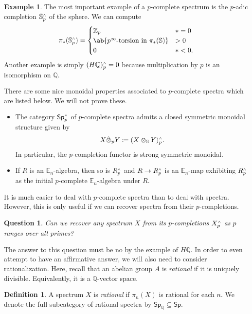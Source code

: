 \documentclass[10pt, oneside]{memoir}
\newtheorem{quest}[thm]{Question}
\theoremstyle{definition}
\newtheorem{defn}[thm]{Definition}
\newtheorem{exm}[thm]{Example}
\theoremstyle{remark}
\theoremstyle{plain}
\theoremstyle{definition}
\theoremstyle{remark}
\newcommand{\Z}{\mathbb{Z}}
\newcommand{\Q}{\mathbb{Q}}
\newcommand{\E}{\mathbb{E}}
\newcommand{\bS}{\mathbb{S}}
\newcommand{\ms}[1]{\mathsf{#1}}
\newcommand{\1}{\mathbf{1}}
\newcommand{\2}{\mathbf{2}}
\newcommand{\3}{\mathbf{3}}
\newcommand{\sw}{\mathsmaller{\wedge}}
\begin{document}
\begin{exm}
    The most important example of a \(p \)-complete spectrum is the \(p \)-adic completion \(\bS_p^{\sw} \) of the sphere. We can compute
    \[ \pi_*(\bS_p^{\sw}) = \begin{cases}
        \Z_p & *=0 \\
        \ab\{\text{\(p^{\infty} \)-torsion in } \pi_*(\bS) \} & > 0 \\
        0 & * < 0.
    \end{cases} \]
    Another example is simply \((H\Q)_p^{\sw} = 0 \) because multiplication by \(p \) is an isomorphism on \(\Q \).
\end{exm}

There are some nice monoidal properties associated to \(p \)-complete spectra which are listed below. We will not prove these.
\begin{itemize}
    \item The category \(\ms{Sp}_p^{\sw} \) of \(p \)-complete spectra admits a closed symmetric monoidal structure given by
    \[ X \hat{\otimes}_p Y \coloneqq (X \otimes_{\bS} Y)_p^{\sw}. \]
    In particular, the \(p \)-completion functor is strong symmetric monoidal.
    \item If \(R \) is an \(\E_n \)-algebra, then so is \(R_p^{\sw} \) and \(R \to R_p^{\sw} \) is an \(\E_n \)-map exhibiting \(R_p^{\sw} \) as the initial \(p \)-complete \(\E_n \)-algebra under \(R \).
\end{itemize}

It is much easier to deal with \(p \)-complete spectra than to deal with spectra. However, this is only useful if we can recover spectra from their \(p \)-completions.

\begin{quest}
    Can we recover any spectrum \(X \) from its \(p \)-completions \(X_p^{\sw} \) as \(p \) ranges over all primes?
\end{quest}

The answer to this question must be no by the example of \(H\Q \). In order to even attempt to have an affirmative answer, we will also need to consider rationalization. Here, recall that an abelian group \(A \) is \textit{rational} if it is uniquely divisible. Equivalently, it is a \(\Q \)-vector space.

\begin{defn}
    A spectrum \(X \) is \textit{rational} if \(\pi_n (X) \) is rational for each \(n \). We denote the full subcategory of rational spectra by \(\ms{Sp}_{\Q} \subseteq \ms{Sp} \).
\end{defn}
\end{document}
